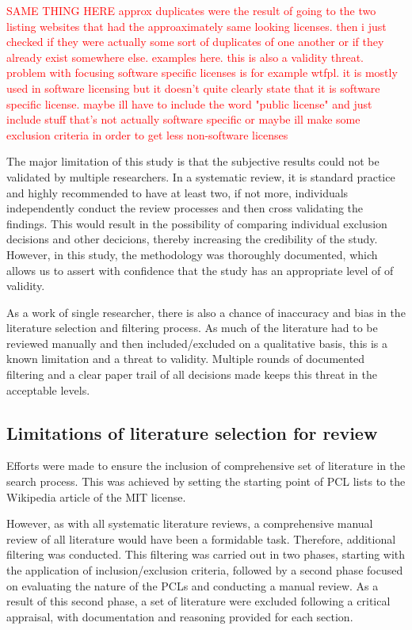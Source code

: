 \textcolor{red}{SAME THING HERE approx duplicates were the result of going to the two listing websites that had the approaximately same looking licenses. then i just checked if they were actually some sort of duplicates of one another or if they already exist somewhere else. examples here. this is also a validity threat. problem with focusing software specific licenses is for example wtfpl. it is mostly used in software licensing but it doesn't quite clearly state that it is software specific license. maybe ill have to include the word "public license" and just include stuff that's not actually software specific or maybe ill make some exclusion criteria in order to get less non-software licenses}

The major limitation of this study is that the subjective results could not be validated by multiple researchers. In a systematic review, it is standard practice and highly recommended to have at least two, if not more, individuals independently conduct the review processes and then cross validating the findings. This would result in the possibility of comparing individual exclusion decisions and other decicions, thereby increasing the credibility of the study. However, in this study, the methodology was thoroughly documented, which allows us to assert with confidence that the study has an appropriate level of of validity.

As a work of single researcher, there is also a chance of inaccuracy and bias in the literature selection and filtering process. As much of the literature had to be reviewed manually and then included/excluded on a qualitative basis, this is a known limitation and a threat to validity. Multiple rounds of documented filtering and a clear paper trail of all decisions made keeps this threat in the acceptable levels.

\subsection{Limitations of literature selection for review}
Efforts were made to ensure the inclusion of comprehensive set of literature in the search process. This was achieved by setting the starting point of PCL lists to the Wikipedia article of the MIT license.

However, as with all systematic literature reviews, a comprehensive manual review of all literature would have been a formidable task. Therefore, additional filtering was conducted. This filtering was carried out in two phases, starting with the application of inclusion/exclusion criteria, followed by a second phase focused on evaluating the nature of the PCLs and conducting a manual review. As a result of this second phase, a set of literature were excluded following a critical appraisal, with documentation and reasoning provided for each section.

